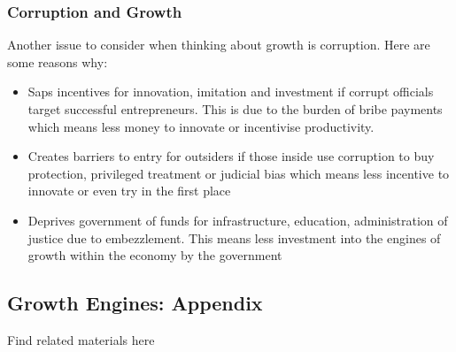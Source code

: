 \documentclass[12pt, letterpaper]{article}
\begin{document}
\subsubsection{Corruption and Growth}
Another issue to consider when thinking about growth is corruption. Here are some reasons why:
\begin{itemize}
	\item Saps incentives for innovation, imitation and investment if corrupt officials target successful entrepreneurs. This is due to the burden of bribe payments which means less money to innovate or incentivise productivity.
	\item Creates barriers to entry for outsiders if those inside use corruption to buy protection, privileged treatment or judicial bias which means less incentive to innovate or even try in the first place
	\item Deprives government of funds for infrastructure, education, administration of justice due to embezzlement. This means less investment into the engines of growth within the economy by the government
\end{itemize}

\subsection{Growth Engines: Appendix}
Find related materials here
\end{document}

